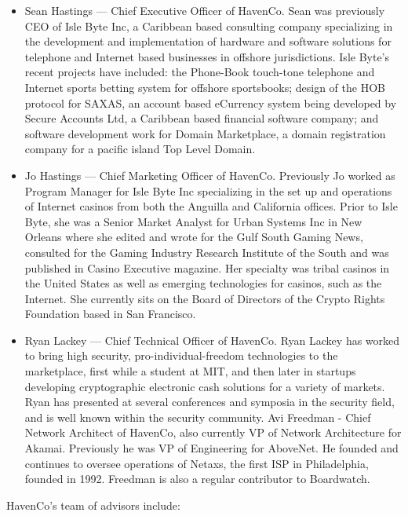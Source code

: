 \begin{itemize}
\item Sean Hastings --- Chief Executive Officer of HavenCo. Sean was previously CEO of Isle Byte Inc, a Caribbean based consulting company specializing in the development and implementation of hardware and software solutions for telephone and Internet based businesses in offshore jurisdictions. Isle Byte's recent projects have included: the Phone-Book touch-tone telephone and Internet sports betting system for offshore sportsbooks; design of the HOB protocol for SAXAS, an account based eCurrency system being developed by Secure Accounts Ltd, a Caribbean based financial software company; and software development work for Domain Marketplace, a domain registration company for a pacific island Top Level Domain.
\item Jo Hastings --- Chief Marketing Officer of HavenCo. Previously Jo worked as Program Manager for Isle Byte Inc specializing in the set up and operations of Internet casinos from both the Anguilla and California offices. Prior to Isle Byte, she was a Senior Market Analyst for Urban Systems Inc in New Orleans where she edited and wrote for the Gulf South Gaming News, consulted for the Gaming Industry Research Institute of the South and was published in Casino Executive magazine. Her specialty was tribal casinos in the United States as well as emerging technologies for casinos, such as the Internet. She currently sits on the Board of Directors of the Crypto Rights Foundation based in San Francisco.
\item Ryan Lackey --- Chief Technical Officer of HavenCo. Ryan Lackey has worked to bring high security, pro-individual-freedom technologies to the marketplace, first while a student at MIT, and then later in startups developing cryptographic electronic cash solutions for a variety of markets.  Ryan has presented at several conferences and symposia in the security field, and is well known within the security community.
Avi Freedman - Chief Network Architect of HavenCo, also currently VP of Network Architecture for Akamai. Previously he was VP of Engineering for AboveNet. He founded and continues to oversee operations of Netaxs, the first ISP in Philadelphia, founded in 1992. Freedman is also a regular contributor to Boardwatch.
\end{itemize}
 

HavenCo's team of advisors include:

